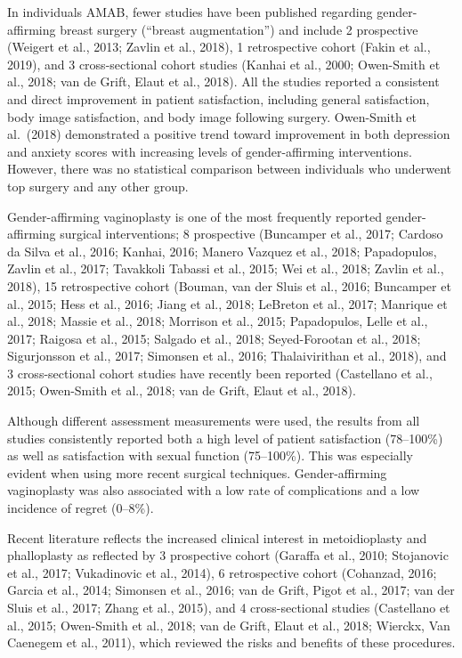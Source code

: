 \documentclass[
]{book}
\begin{document}
In individuals AMAB, fewer studies have been
published regarding gender-affirming breast surgery (``breast augmentation'') and include 2 prospective (Weigert et al., 2013; Zavlin et al., 2018),
1 retrospective cohort (Fakin et al., 2019), and 3
cross-sectional cohort studies (Kanhai et al., 2000;
Owen-Smith et al., 2018; van de Grift, Elaut
et al., 2018). All the studies reported a consistent
and direct improvement in patient satisfaction,
including general satisfaction, body image satisfaction, and body image following surgery.
Owen-Smith et al.~(2018) demonstrated a positive
trend toward improvement in both depression
and anxiety scores with increasing levels of
gender-affirming interventions. However, there
was no statistical comparison between individuals
who underwent top surgery and any other group.

Gender-affirming vaginoplasty is one of the
most frequently reported gender-affirming surgical
interventions; 8 prospective (Buncamper et al.,
2017; Cardoso da Silva et al., 2016; Kanhai, 2016;
Manero Vazquez et al., 2018; Papadopulos, Zavlin
et al., 2017; Tavakkoli Tabassi et al., 2015; Wei
et al., 2018; Zavlin et al., 2018), 15 retrospective
cohort (Bouman, van der Sluis et al., 2016;
Buncamper et al., 2015; Hess et al., 2016; Jiang
et al., 2018; LeBreton et al., 2017; Manrique et al.,
2018; Massie et al., 2018; Morrison et al., 2015;
Papadopulos, Lelle et al., 2017; Raigosa et al., 2015;
Salgado et al., 2018; Seyed-Forootan et al., 2018;
Sigurjonsson et al., 2017; Simonsen et al., 2016;
Thalaivirithan et al., 2018), and 3 cross-sectional
cohort studies have recently been reported
(Castellano et al., 2015; Owen-Smith et al., 2018;
van de Grift, Elaut et al., 2018).

Although different assessment measurements
were used, the results from all studies consistently
reported both a high level of patient satisfaction
(78--100\%) as well as satisfaction with sexual
function (75--100\%). This was especially evident
when using more recent surgical techniques.
Gender-affirming vaginoplasty was also associated
with a low rate of complications and a low incidence of regret (0--8\%).

Recent literature reflects the increased clinical
interest in metoidioplasty and phalloplasty as
reflected by 3 prospective cohort (Garaffa et al.,
2010; Stojanovic et al., 2017; Vukadinovic et al.,
2014), 6 retrospective cohort (Cohanzad, 2016;
Garcia et al., 2014; Simonsen et al., 2016; van de
Grift, Pigot et al., 2017; van der Sluis et al., 2017;
Zhang et al., 2015), and 4 cross-sectional studies
(Castellano et al., 2015; Owen-Smith et al., 2018;
van de Grift, Elaut et al., 2018; Wierckx, Van
Caenegem et al., 2011), which reviewed the risks
and benefits of these procedures.
\end{document}
